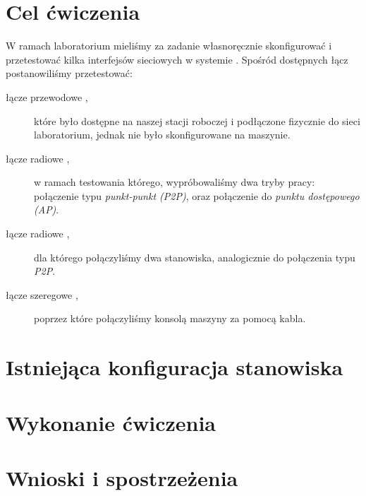 \documentclass[a4paper,11pt,notitlepage]{article}
\begin{document}

\maketitle
\tableofcontents


\section{Cel ćwiczenia}

W ramach laboratorium mieliśmy za zadanie własnoręcznie skonfigurować i
przetestować kilka interfejsów sieciowych w systemie \bsd. Spośród dostępnych
łącz postanowiliśmy przetestować:

\begin{description}
    \item[łącze przewodowe \eth\textnormal{,}] które było dostępne na naszej stacji roboczej
        i podłączone fizycznie do sieci laboratorium, jednak nie było
        skonfigurowane na maszynie.
    \item[łącze radiowe \wifi\textnormal{,}] w ramach testowania którego, wypróbowaliśmy
        dwa tryby pracy: połączenie typu \emph{punkt-punkt (P2P)}, oraz
        połączenie do \emph{punktu dostępowego (AP)}.
    \item[łącze radiowe \bt\textnormal{,}] dla którego połączyliśmy dwa stanowiska,
        analogicznie do połączenia typu \wifi{} \emph{P2P}.
    \item[łącze szeregowe \uart\textnormal{,}] poprzez które połączyliśmy konsolą maszyny
        \zielone{} za pomocą kabla.
\end{description}


\section{Istniejąca konfiguracja stanowiska}


\section{Wykonanie ćwiczenia}


\section{Wnioski i spostrzeżenia}
\end{document}
